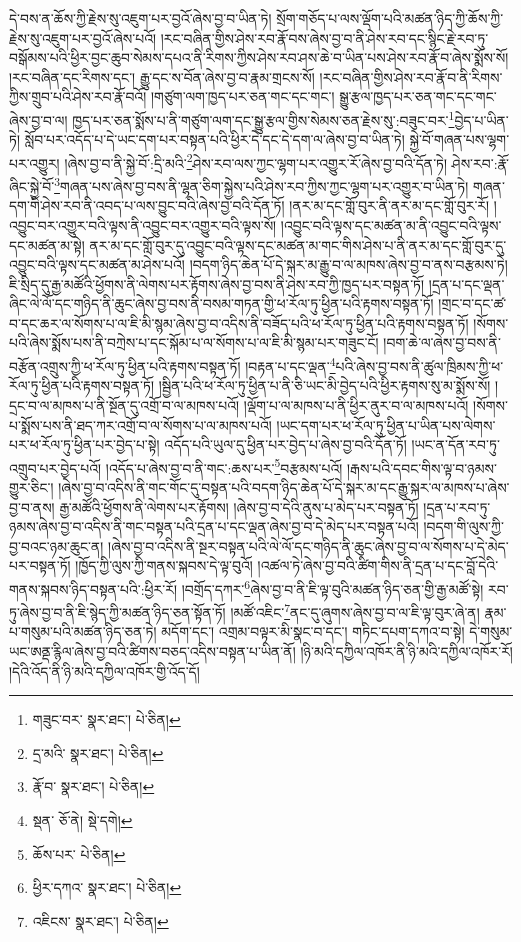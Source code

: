 དེ་བས་ན་ཆོས་ཀྱི་རྗེས་སུ་འཇུག་པར་བྱའོ་ཞེས་བྱ་བ་ཡིན་ཏེ། སྲོག་གཅོད་པ་ལས་ལྡོག་པའི་མཚན་ཉིད་ཀྱི་ཆོས་ཀྱི་རྗེས་སུ་འཇུག་པར་བྱའོ་ཞེས་པའོ། །རང་བཞིན་གྱིས་ཤེས་རབ་རྣོ་བས་ཞེས་བྱ་བ་ནི་ཤེས་རབ་དང་སྙིང་རྗེ་རབ་ཏུ་བསྒོམས་པའི་ཕྱིར་བྱང་ཆུབ་སེམས་དཔའ་ནི་རིགས་ཀྱིས་ཤེས་རབ་ཤས་ཆེ་བ་ཡིན་པས་ཤེས་རབ་རྣོ་བ་ཞེས་སྨོས་སོ། །རང་བཞིན་དང་རིགས་དང་། རྒྱུ་དང་ས་བོན་ཞེས་བྱ་བ་རྣམ་གྲངས་སོ། །རང་བཞིན་གྱིས་ཤེས་རབ་རྣོ་བ་ནི་རིགས་ཀྱིས་གྲུབ་པའི་ཤེས་རབ་རྣོ་བའོ། །གཙུག་ལག་ཁྱད་པར་ཅན་གང་དང་གང་། སྒྱུ་རྩལ་ཁྱད་པར་ཅན་གང་དང་གང་ཞེས་བྱ་བ་ལ། ཁྱད་པར་ཅན་སྨོས་པ་ནི་གཙུག་ལག་དང་སྒྱུ་རྩལ་གྱིས་སེམས་ཅན་རྗེས་སུ་:བཟུང་བར་\footnote{གཟུང་བར་  སྣར་ཐང་།  པེ་ཅིན། }བྱེད་པ་ཡིན་ཏེ། སློབ་པར་འདོད་པ་དེ་ཡང་དག་པར་བསྟན་པའི་ཕྱིར་དེ་དང་དེ་དག་ལ་ཞེས་བྱ་བ་ཡིན་ཏེ། སྐྱེ་བོ་གཞན་པས་ལྷག་པར་འགྱུར། །ཞེས་བྱ་བ་ནི་སྐྱེ་བོ་:དྲི་མའི་\footnote{དྲ་མའི་  སྣར་ཐང་།  པེ་ཅིན། }ཤེས་རབ་ལས་ཀྱང་ལྷག་པར་འགྱུར་རོ་ཞེས་བྱ་བའི་དོན་ཏེ། ཤེས་རབ་:རྣོ་ཞིང་སྐྱེ་བོ་\footnote{རྣོ་བ་  སྣར་ཐང་།  པེ་ཅིན། }གཞན་པས་ཞེས་བྱ་བས་ནི་ལྷན་ཅིག་སྐྱེས་པའི་ཤེས་རབ་ཀྱིས་ཀྱང་ལྷག་པར་འགྱུར་བ་ཡིན་ཏེ། གཞན་དག་གི་ཤེས་རབ་ནི་འབད་པ་ལས་བྱུང་བའི་ཞེས་བྱ་བའི་དོན་ཏོ། །ནར་མ་དང་གློ་བུར་ནི་ནར་མ་དང་གློ་བུར་རོ། །འབྱུང་བར་འགྱུར་བའི་ལྟས་ནི་འབྱུང་བར་འགྱུར་བའི་ལྟས་སོ། །འབྱུང་བའི་ལྟས་དང་མཚན་མ་ནི་འབྱུང་བའི་ལྟས་དང་མཚན་མ་སྟེ། ནར་མ་དང་གློ་བུར་དུ་འབྱུང་བའི་ལྟས་དང་མཚན་མ་གང་གིས་ཤེས་པ་ནི་ནར་མ་དང་གློ་བུར་དུ་འབྱུང་བའི་ལྟས་དང་མཚན་མ་ཤེས་པའོ། །བདག་ཉིད་ཆེན་པོ་དེ་སྐར་མ་རྒྱུ་བ་ལ་མཁས་ཞེས་བྱ་བ་ནས་བརྩམས་ཏེ། ཇི་སྲིད་དུ་རྒྱ་མཚོའི་ཕྱོགས་ནི་ལེགས་པར་རྟོགས་ཞེས་བྱ་བས་ནི་ཤེས་རབ་ཀྱི་ཁྱད་པར་བསྟན་ཏོ། །དྲན་པ་དང་ལྡན་ཞིང་ལེ་ལོ་དང་གཉིད་ནི་ཆུང་ཞེས་བྱ་བས་ནི་བསམ་གཏན་གྱི་ཕ་རོལ་ཏུ་ཕྱིན་པའི་རྟགས་བསྟན་ཏོ། །གྲང་བ་དང་ཚ་བ་དང་ཆར་ལ་སོགས་པ་ལ་ཇི་མི་སྙམ་ཞེས་བྱ་བ་འདིས་ནི་བཟོད་པའི་ཕ་རོལ་ཏུ་ཕྱིན་པའི་རྟགས་བསྟན་ཏོ། །སོགས་པའི་ཞེས་སྨོས་པས་ནི་བཀྲེས་པ་དང་སྐོམ་པ་ལ་སོགས་པ་ལ་ཇི་མི་སྙམ་པར་གཟུང་ངོ། །བག་ཆེ་ལ་ཞེས་བྱ་བས་ནི་བརྩོན་འགྲུས་ཀྱི་ཕ་རོལ་ཏུ་ཕྱིན་པའི་རྟགས་བསྟན་ཏོ། །བརྟན་པ་དང་ལྡན་\footnote{སྡན་  ཅོ་ནེ།  སྡེ་དགེ། }པའི་ཞེས་བྱ་བས་ནི་ཚུལ་ཁྲིམས་ཀྱི་ཕ་རོལ་ཏུ་ཕྱིན་པའི་རྟགས་བསྟན་ཏོ། །སྦྱིན་པའི་ཕ་རོལ་ཏུ་ཕྱིན་པ་ནི་ཅི་ཡང་མི་བྱེད་པའི་ཕྱིར་རྟགས་སུ་མ་སྨོས་སོ། །དྲང་བ་ལ་མཁས་པ་ནི་སྔོན་དུ་འགྲོ་བ་ལ་མཁས་པའོ། །ལྡོག་པ་ལ་མཁས་པ་ནི་ཕྱིར་ནུར་བ་ལ་མཁས་པའོ། །སོགས་པ་སྨོས་པས་ནི་ཐད་ཀར་འགྲོ་བ་ལ་སོགས་པ་ལ་མཁས་པའོ། །ཡང་དག་པར་ཕ་རོལ་ཏུ་ཕྱིན་པ་ཡིན་པས་ལེགས་པར་ཕ་རོལ་ཏུ་ཕྱིན་པར་བྱེད་པ་སྟེ། འདོད་པའི་ཡུལ་དུ་ཕྱིན་པར་བྱེད་པ་ཞེས་བྱ་བའི་དོན་ཏོ། །ཡང་ན་དོན་རབ་ཏུ་འགྲུབ་པར་བྱེད་པའོ། །འདོད་པ་ཞེས་བྱ་བ་ནི་གང་:ཆས་པར་\footnote{ཆོས་པར་  པེ་ཅིན། }བརྩམས་པའོ། །རྒས་པའི་དབང་གིས་ལྟ་བ་ཉམས་གྱུར་ཅིང་། །ཞེས་བྱ་བ་འདིས་ནི་གང་གོང་དུ་བསྟན་པའི་བདག་ཉིད་ཆེན་པོ་དེ་སྐར་མ་དང་རྒྱུ་སྐར་ལ་མཁས་པ་ཞེས་བྱ་བ་ནས། རྒྱ་མཚོའི་ཕྱོགས་ནི་ལེགས་པར་རྟོགས། །ཞེས་བྱ་བ་དེའི་ནུས་པ་མེད་པར་བསྟན་ཏོ། །དྲན་པ་རབ་ཏུ་ཉམས་ཞེས་བྱ་བ་འདིས་ནི་གང་བསྟན་པའི་དྲན་པ་དང་ལྡན་ཞེས་བྱ་བ་དེ་མེད་པར་བསྟན་པའོ། །བདག་གི་ལུས་ཀྱི་བྱ་བའང་ཉམ་ཆུང་ན། །ཞེས་བྱ་བ་འདིས་ནི་སྔར་བསྟན་པའི་ལེ་ལོ་དང་གཉིད་ནི་ཆུང་ཞེས་བྱ་བ་ལ་སོགས་པ་དེ་མེད་པར་བསྟན་ཏོ། །ཁྱོད་ཀྱི་ལུས་ཀྱི་གནས་སྐབས་དེ་ལྟ་བུའོ། །འཚལ་ཏེ་ཞེས་བྱ་བའི་ཚིག་གིས་ནི་དྲན་པ་དང་བློ་དེའི་གནས་སྐབས་ཉིད་བསྟན་པའི་:ཕྱིར་རོ། །བགྲོད་དཀར་\footnote{ཕྱིར་དཀའ་  སྣར་ཐང་།  པེ་ཅིན། }ཞེས་བྱ་བ་ནི་ཇི་ལྟ་བུའི་མཚན་ཉིད་ཅན་གྱི་རྒྱ་མཚོ་སྟེ། རབ་ཏུ་ཞེས་བྱ་བ་ནི་ཇི་སྙེད་ཀྱི་མཚན་ཉིད་ཅན་སྟོན་ཏོ། །མཚོ་འཇིང་\footnote{འཇིངས་  སྣར་ཐང་།  པེ་ཅིན། }ནང་དུ་ཞུགས་ཞེས་བྱ་བ་ལ་ཇི་ལྟ་བུར་ཞེ་ན། རྣམ་པ་གསུམ་པའི་མཚན་ཉིད་ཅན་ཏེ། མདོག་དང་། འགྲམ་བལྟར་མི་སྣང་བ་དང་། གཏིང་དཔག་དཀའ་བ་སྟེ། དེ་གསུམ་ཡང་ཨནྡ་རྙིལ་ཞེས་བྱ་བའི་ཚིགས་བཅད་འདིས་བསྟན་པ་ཡིན་ནོ། །ཉི་མའི་དཀྱིལ་འཁོར་ནི་ཉི་མའི་དཀྱིལ་འཁོར་རོ། །དེའི་འོད་ནི་ཉི་མའི་དཀྱིལ་འཁོར་གྱི་འོད་དོ། 